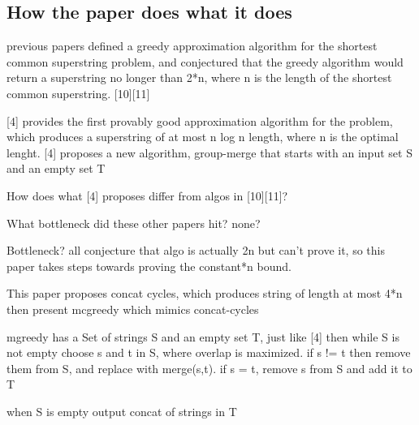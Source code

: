 \documentclass[letterpaper,twocolumn,11pt,titlepage]{article}
\begin{document}
\subsection*{How the paper does what it does}

previous papers defined a greedy approximation algorithm for the shortest common superstring
problem, and conjectured that the greedy algorithm would return a superstring no longer than 
2*n, where n is the length of the shortest common superstring.  [10][11]

[4] provides the first provably good approximation algorithm for the problem, which produces
a superstring of at most n log n length, where n is the optimal lenght.
[4] proposes a new algorithm, group-merge that starts with
an input set S and an empty set T

How does what [4] proposes differ from algos in [10][11]?

What bottleneck did these other papers hit?
none?

Bottleneck?  all conjecture that algo is actually 2n but can't prove it, so this paper
takes steps towards proving the constant*n bound.

This paper proposes concat cycles, which produces string of length at most 4*n
then present mcgreedy which mimics concat-cycles

mgreedy has a Set of strings S and an empty set T, just like [4]
then while S is not empty choose s and t in S, where overlap is maximized.  if s != t
then remove them from S, and replace with merge(s,t).  if s = t, remove s from S and add it to T

when S is empty output concat of strings in T


{
  \small 
  
  
}
\end{document}
